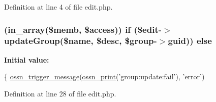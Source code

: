 Definition at line 4 of file edit.\+php.

\subsubsection[{\texorpdfstring{else}{else}}]{ (in\+\_\+array(\$memb, \$access)) {\bf if} (\$edit-\/$>$update\+Group(\${\bf name}, \$desc, \$group-\/$>$guid)) else}\hypertarget{components_2_ossn_groups_2actions_2group_2edit_8php_a3802405e9405d3f4c965ebac3177560b}{}\label{components_2_ossn_groups_2actions_2group_2edit_8php_a3802405e9405d3f4c965ebac3177560b}
{\bfseries Initial value\+:}
\begin{DoxyCode}
\{
    \hyperlink{ossn_8lib_8system_8php_ab3f23f23f32f50c12e7aea0ffaccaac7}{ossn\_trigger\_message}(\hyperlink{ossn_8lib_8languages_8php_a2be5d1c4b695593a9b9067b96df2150a}{ossn\_print}(\textcolor{stringliteral}{'group:update:fail'}), \textcolor{stringliteral}{'error'})
\end{DoxyCode}


Definition at line 28 of file edit.\+php.

